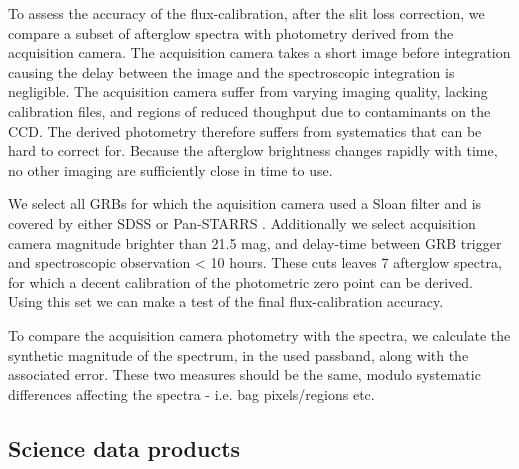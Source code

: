 \documentclass[longauth]{aa}    %
\begin{document}
To assess the accuracy of the flux-calibration, after the slit loss correction,
we compare a subset of afterglow spectra with photometry derived from the
acquisition camera. The acquisition camera takes a short image before
integration causing the delay between the image and the spectroscopic
integration is negligible. The acquisition camera suffer from varying imaging
quality, lacking calibration files, and regions of reduced thoughput due to
contaminants on the CCD. The derived photometry therefore suffers from
systematics that can be hard to correct for. Because the afterglow brightness
changes rapidly with time, no other imaging are sufficiently close in time to
use.

We select all GRBs for which the aquisition camera used a Sloan filter
\citep{Gunn1998} and is covered by either SDSS \citep{Abolfathi2018} or
Pan-STARRS \citep{Chambers2016}. Additionally we select acquisition camera
magnitude brighter than 21.5 mag, and delay-time between GRB trigger and
spectroscopic observation < 10 hours. These cuts leaves 7 afterglow spectra, for
which a decent calibration of the photometric zero point can be derived. Using
this set we can make a test of the final flux-calibration accuracy.

To compare the acquisition camera photometry with the spectra, we calculate the
synthetic magnitude of the spectrum, in the used passband, along with the
associated error. These two measures should be the same, modulo systematic
differences affecting the spectra - i.e. bag pixels/regions etc. 


\subsection{Science data products} \label{products}

\end{document}
